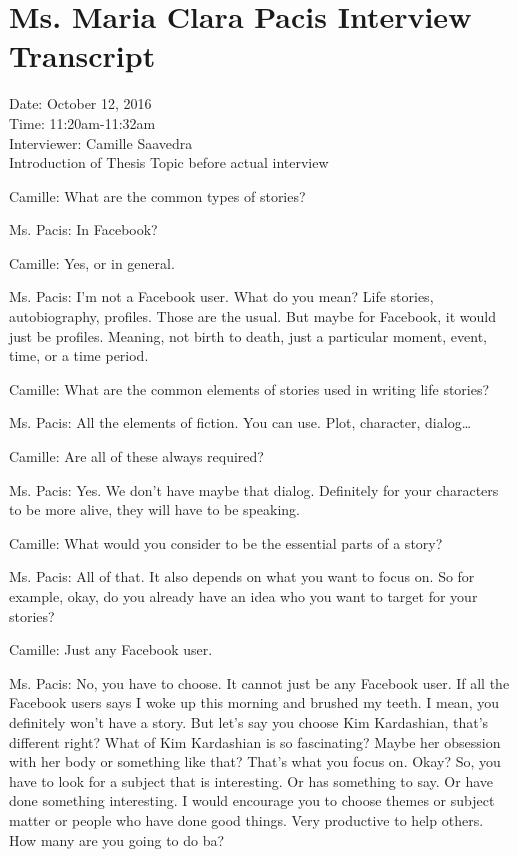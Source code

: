 %
%
%                 

\chapter{Ms. Maria Clara Pacis Interview Transcript}
\label{sec:appendixd}

Date: October 12, 2016 \\
Time: 11:20am-11:32am \\
Interviewer: Camille Saavedra \\
 
Introduction of Thesis Topic before actual interview
 
Camille: What are the common types of stories?
 
Ms. Pacis: In Facebook?
 
Camille: Yes, or in general.
 
Ms. Pacis: I’m not a Facebook user. What do you mean? Life stories, autobiography, profiles. Those are the usual. But maybe for Facebook, it would just be profiles. Meaning, not birth to death, just a particular moment, event, time, or a time period.
 
Camille: What are the common elements of stories used in writing life stories?
 
Ms. Pacis: All the elements of fiction. You can use. Plot, character, dialog…
 
Camille: Are all of these always required?
 
Ms. Pacis: Yes. We don't have maybe that dialog. Definitely for your characters to be more alive, they will have to be speaking.
 
Camille: What would you consider to be the essential parts of a story?
 
Ms. Pacis: All of that. It also depends on what you want to focus on. So for example, okay, do you already have an idea who you want to target for your stories?
 
Camille: Just any Facebook user.
 
Ms. Pacis: No, you have to choose. It cannot just be any Facebook user. If all the Facebook users says I woke up this morning and brushed my teeth. I mean, you definitely won’t have a story. But let's say you choose Kim Kardashian, that's different right? What of Kim Kardashian is so fascinating? Maybe her obsession with her body or something like that? That's what you focus on. Okay? So, you have to look for a subject that is interesting. Or has something to say. Or have done something interesting. I would encourage you to choose themes or subject matter or people who have done good things. Very productive to help others. How many are you going to do ba?
 
